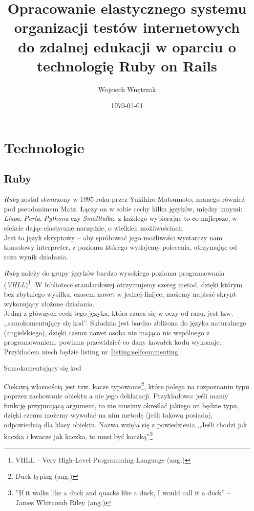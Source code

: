 \documentclass[a4paper,12pt]{article}
\begin{document}
\author{Wojciech Wnętrzak}
\title{Opracowanie elastycznego systemu organizacji testów internetowych do zdalnej
edukacji w oparciu o technologię Ruby on Rails}
\date{\today}

\begin{titlepage}
\maketitle
\end{titlepage}

\section{Technologie}
\subsection{Ruby}
\emph{Ruby} został stworzony w 1995 roku przez Yukihiro Matsumoto, znanego również
pod pseudonimem Matz. Łączy on w sobie cechy kilku języków, między innymi: \emph{Lispa},
\emph{Perla}, \emph{Pythona} czy \emph{Smalltalka}, z każdego wybierając to co najlepsze,
w efekcie dając elastyczne narzędzie, o wielkich możliwościach.\\
Jest to język skryptowy -- aby spróbować jego możliwości wystarczy nam konsolowy
interpreter, z poziomu którego wydajemy polecenia, otrzymując od razu wynik działania.


\emph{Ruby} należy do grupy języków bardzo wysokiego poziomu programowania
(\emph{VHLL})\footnote{VHLL -- Very High-Level Programming Language (ang.)}.
W bibliotece standardowej otrzymujemy szereg metod, dzięki którym bez zbytniego wysiłku,
czasem nawet w jednej linijce, możemy napisać skrypt wykonujący złożone działania.\\
Jedną z głównych cech tego języka, która rzuca się w oczy od razu, jest tzw.
,,samokomentujący się kod''. Składnia jest bardzo zbliżona do języka naturalnego
(angielskiego), dzięki czemu nawet osoba nie mająca nic wspólnego z programowaniem,
powinna przewidzieć co dany kawałek kodu wykonuje. Przykładem niech będzie
listing nr \ref{listing:selfcommenting}.
\begin{listing}
  
  \caption{Samokomentujący się kod}
  \label{listing:selfcommenting}
\end{listing}


Ciekawą własnością jest tzw. kacze typowanie\footnote{Duck typing (ang.)}, które polega na
rozpoznaniu typu poprzez zachowanie obiektu a nie jego deklaracji. Przykładowo: jeśli mamy
funkcję przyjmującą argument, to nie musimy określać jakiego on będzie typu, dzięki czemu
możemy wywołać na nim metodę (jeśli takową posiada), odpowiednią dla klasy obiektu. Nazwa
wzięła się z powiedzienia ,,Jeśli chodzi jak kaczka i kwacze jak kaczka, to musi być
kaczką''\footnote{''If it walks like a duck and quacks like a duck, I would call it a duck''
-- James Whitcomb Riley (ang.)}
\end{document}
